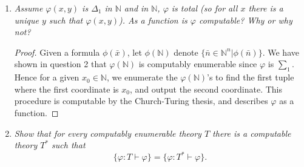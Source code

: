 \documentclass{article}
\begin{document}
\begin{enumerate}[label={\bf Q\arabic*:}]
    \begin{proof}
      Yes $W$ is computably enumerable. If $W$ is finite then it is
      trivially computably enumerable. So assume $W$ is infinite. Now since
      $\varphi$ is $\sum_1$, $\varphi(x)$ is equivalent to $\exists
      y\;\phi(x,y)$ for some $\Delta_0$-formula $\phi$. Fix any
      computable permutation
      $p:\mathbb{N}\rightarrow\mathbb{N}\times\mathbb{N}$, and let $\pi_i$
      denote the $i$th projection function. Consider the function
      $f(n):\mathbb{N}\rightarrow\mathbb{N}$ defined recursively as
      follows: \\

      At input $0$, we find the first $s_0\in\mathbb{N}$ such that
      $\phi(\pi_1(p(s_0)),\pi_2(p(s_0)))$ holds, and output
      $\pi_1(p(s_0))$. Then, at input $n+1$, we find the next
      $s_{n+1}>s_{n}$ such that $\phi(\pi_1(p(s_{n+1})),\pi_2(p(s_{n+1})))$
      holds, and output $\pi_1(p(s_{n+1}))$. Note that the $s_{n}$'s exists
      because $W$ is infinite. Also, given $m,n\in\mathbb{N}$, checking if
      $\phi(m,n)$ holds is al algorithmic procedure that always terminates
      since $\phi$ is $\Delta_0$.  So $f$ is defined by an
      algorithmic procedure and produces an output for every input,
      therefore it is total recursive by the Church-Turing thesis. Also,
      since $p$ is surjective, $f$ will enumerate all elements of $W$. 
    \end{proof}

  \item \it Assume $\varphi(x,y)$ is $\Delta_1$ in $\mathbb{N}$ and
    in $\mathbb{N}$, $\varphi$ is total (so for all $x$ there is a unique
    $y$ such that $\varphi(x,y)$). As a function is $\varphi$ computable?
    Why or why not?

    \begin{proof}
      Given a formula $\phi(\bar{x})$, let $\phi(\mathbb{N})$ denote
      $\{\bar{n}\in\mathbb{N}^n|\phi(\bar{n})\}$. We have shown in
      question 2 that $\varphi(\mathbb{N})$ is computably enumerable since
      $\varphi$ is $\sum_1$. Hence for a given $x_0\in\mathbb{N}$, we
      enumerate the $\varphi(\mathbb{N})$'s to find the first tuple where
      the first coordinate is $x_0$, and output the second coordinate.
      This procedure is computable by the Church-Turing thesis, and
      describes $\varphi$ as a function.
    \end{proof}

  \item \it Show that for every computably enumerable theory $T$ there is
    a computable theory $T^*$ such that
    \[\{\varphi:T\vdash\varphi\} = \{\varphi:T^*\vdash\varphi\}.\]


\end{enumerate}
\end{document}
